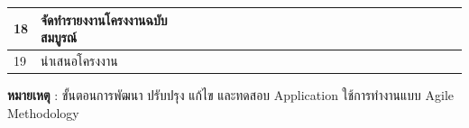 \documentclass[12pt,oneside,openright,a4paper]{cpe-thai-project}
\begin{document}
\begin{table}[h]
{\begin{tabular}{|llllllllllllllllllllll|}
\multicolumn{1}{|l|}{18}                    & \multicolumn{1}{l|}{จัดทำรายงงานโครงงานฉบับสมบูรณ์}                                       & \multicolumn{1}{l|}{}                         & \multicolumn{1}{l|}{}                         & \multicolumn{1}{l|}{}                         & \multicolumn{1}{l|}{}                         & \multicolumn{1}{l|}{}                         & \multicolumn{1}{l|}{}                         & \multicolumn{1}{l|}{}                         & \multicolumn{1}{l|}{}                         & \multicolumn{1}{l|}{\cellcolor[HTML]{2D8C9F}} & \multicolumn{1}{l|}{\cellcolor[HTML]{2D8C9F}} & \multicolumn{1}{l|}{\cellcolor[HTML]{2D8C9F}} & \multicolumn{1}{l|}{\cellcolor[HTML]{2D8C9F}} & \multicolumn{1}{l|}{\cellcolor[HTML]{2D8C9F}} & \multicolumn{1}{l|}{\cellcolor[HTML]{2D8C9F}} & \multicolumn{1}{l|}{\cellcolor[HTML]{2D8C9F}} & \multicolumn{1}{l|}{\cellcolor[HTML]{2D8C9F}} & \multicolumn{1}{l|}{\cellcolor[HTML]{2D8C9F}{\color[HTML]{2D8C9F} }} & \multicolumn{1}{l|}{\cellcolor[HTML]{2D8C9F}{\color[HTML]{2D8C9F} }} & \multicolumn{1}{l|}{\cellcolor[HTML]{2D8C9F}{\color[HTML]{2D8C9F} }} & \cellcolor[HTML]{2D8C9F}{\color[HTML]{2D8C9F} } \\ \hline
\multicolumn{1}{|l|}{19}                    & \multicolumn{1}{l|}{นำเสนอโครงงาน}                                                        & \multicolumn{1}{l|}{}                         & \multicolumn{1}{l|}{}                         & \multicolumn{1}{l|}{}                         & \multicolumn{1}{l|}{}                         & \multicolumn{1}{l|}{}                         & \multicolumn{1}{l|}{}                         & \multicolumn{1}{l|}{}                         & \multicolumn{1}{l|}{}                         & \multicolumn{1}{l|}{}                         & \multicolumn{1}{l|}{}                         & \multicolumn{1}{l|}{}                         & \multicolumn{1}{l|}{}                         & \multicolumn{1}{l|}{}                         & \multicolumn{1}{l|}{}                         & \multicolumn{1}{l|}{}                         & \multicolumn{1}{l|}{\cellcolor[HTML]{FFFFFF}} & \multicolumn{1}{l|}{}                                                & \multicolumn{1}{l|}{}                                                & \multicolumn{1}{l|}{\cellcolor[HTML]{2D8C9F}}                        & \cellcolor[HTML]{2D8C9F}                        \\ \hline
\end{tabular}%
}
\end{table}


\FloatBarrier
\textbf{หมายเหตุ} : ขั้นตอนการพัฒนา ปรับปรุง แก้ไข และทดสอบ Application ใช้การทำงานแบบ Agile Methodology
\clearpage
\end{document}

